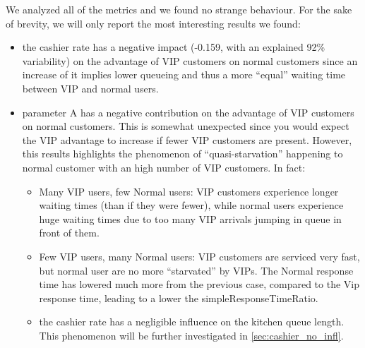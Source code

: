 We analyzed all of the metrics and we found no strange behaviour. For the sake of brevity, we will only report the most interesting results we found:
\begin{itemize}
  \item the cashier rate has a negative impact (-0.159, with an explained 92\%
   variability) on the advantage of VIP customers 
    on normal customers since an increase of it implies lower queueing and thus 
    a more ``equal'' waiting time between VIP and normal users.
  \item parameter A has a negative contribution on the advantage of VIP       
    customers on normal customers. This is somewhat unexpected since you would 
    expect the VIP advantage to increase if fewer VIP customers are present.
    However, this results highlights the phenomenon of ``quasi-starvation''
    happening to normal customer with an high number of VIP customers. In fact:
      \begin{itemize}
        \item Many VIP users, few Normal users: VIP customers experience longer 
          waiting times (than if they were fewer), while normal users experience huge waiting times due to too many VIP arrivals jumping in queue in front of them.
        \item Few VIP users, many Normal users: VIP customers are serviced very fast, but normal user are no more ``starvated'' by VIPs. The Normal response time has lowered much more from the previous case, compared to the Vip response time, leading to a lower the simpleResponseTimeRatio.
        \item the cashier rate has a negligible influence on the kitchen queue length. This phenomenon will be further investigated in \cref{sec:cashier_no_infl}.
      \end{itemize}
\end{itemize} %



% 
 
